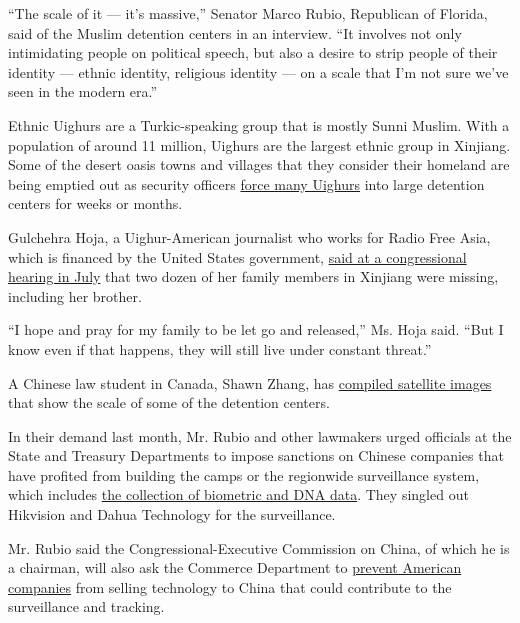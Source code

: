 ``The scale of it --- it's massive,'' Senator Marco Rubio, Republican of
Florida, said of the Muslim detention centers in an interview. ``It
involves not only intimidating people on political speech, but also a
desire to strip people of their identity --- ethnic identity, religious
identity --- on a scale that I'm not sure we've seen in the modern
era.''

Ethnic Uighurs are a Turkic-speaking group that is mostly Sunni Muslim.
With a population of around 11 million, Uighurs are the largest ethnic
group in Xinjiang. Some of the desert oasis towns and villages that they
consider their homeland are being emptied out as security officers
\href{https://www.nchrd.org/2018/07/criminal-arrests-in-xinjiang-account-for-21-of-chinas-total-in-2017/}{force
many Uighurs} into large detention centers for weeks or months.

Gulchehra Hoja, a Uighur-American journalist who works for Radio Free
Asia, which is financed by the United States government,
\href{https://www.cecc.gov/events/hearings/surveillance-suppression-and-mass-detention-xinjiang\%E2\%80\%99s-human-rights-crisis}{said
at a congressional hearing in July} that two dozen of her family members
in Xinjiang were missing, including her brother.

``I hope and pray for my family to be let go and released,'' Ms. Hoja
said. ``But I know even if that happens, they will still live under
constant threat.''

A Chinese law student in Canada, Shawn Zhang, has
\href{http://www.chinafile.com/reporting-opinion/features/what-satellite-images-can-show-us-about-re-education-camps-xinjiang}{compiled
satellite images} that show the scale of some of the detention centers.

In their demand last month, Mr. Rubio and other lawmakers urged
officials at the State and Treasury Departments to impose sanctions on
Chinese companies that have profited from building the camps or the
regionwide surveillance system, which includes
\href{https://www.hrw.org/news/2017/12/13/china-minority-region-collects-dna-millions}{the
collection of biometric and DNA data}. They singled out Hikvision and
Dahua Technology for the surveillance.

Mr. Rubio said the Congressional-Executive Commission on China, of which
he is a chairman, will also ask the Commerce Department to
\href{https://www.cecc.gov/media-center/press-releases/chairs-ask-commerce-secretary-ross-about-sale-of-surveillance-technology}{prevent
American companies} from selling technology to China that could
contribute to the surveillance and tracking.

